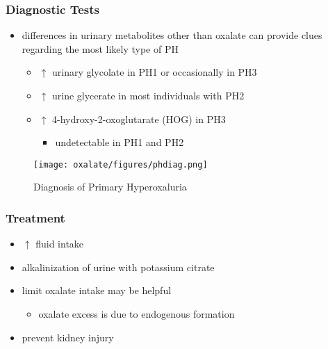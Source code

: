 \documentclass[12pt]{scrartcl}
\begin{document}
\subsubsection{Diagnostic Tests}
\label{sec:org199bb8c}
\begin{itemize}
\item differences in urinary metabolites other than oxalate can provide
clues regarding the most likely type of PH

\begin{itemize}
\item \(\uparrow\) urinary glycolate in PH1 or occasionally in PH3
\item \(\uparrow\) urine glycerate in most individuals with PH2
\item \(\uparrow\) 4-hydroxy-2-oxoglutarate (HOG) in PH3
\begin{itemize}
\item undetectable in PH1 and PH2
\end{itemize}
\end{itemize}
\end{itemize}

\begin{figure}[htbp]
\centering
\texttt{[image: oxalate/figures/phdiag.png]}
\caption{\label{fig:org2563942}Diagnosis of Primary Hyperoxaluria}
\end{figure}

\subsubsection{Treatment}
\label{sec:org45e39ef}
\begin{itemize}
\item \(\uparrow\) fluid intake
\item alkalinization of urine with potassium citrate
\item limit oxalate intake may be helpful
\begin{itemize}
\item oxalate excess is due to endogenous formation
\end{itemize}
\item prevent kidney injury
\end{itemize}
\end{document}
